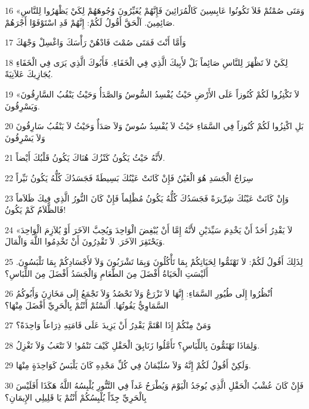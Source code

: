 \par 16 «وَمَتَى صُمْتُمْ فَلاَ تَكُونُوا عَابِسِينَ كَالْمُرَائِينَ فَإِنَّهُمْ يُغَيِّرُونَ وُجُوهَهُمْ لِكَيْ يَظْهَرُوا لِلنَّاسِ صَائِمِينَ. اَلْحَقَّ أَقُولُ لَكُمْ: إِنَّهُمْ قَدِ اسْتَوْفَوْا أَجْرَهُمْ.
\par 17 وَأَمَّا أَنْتَ فَمَتَى صُمْتَ فَادْهُنْ رَأْسَكَ وَاغْسِلْ وَجْهَكَ
\par 18 لِكَيْ لاَ تَظْهَرَ لِلنَّاسِ صَائِماً بَلْ لأَبِيكَ الَّذِي فِي الْخَفَاءِ. فَأَبُوكَ الَّذِي يَرَى فِي الْخَفَاءِ يُجَازِيكَ عَلاَنِيَةً.
\par 19 «لاَ تَكْنِزُوا لَكُمْ كُنُوزاً عَلَى الأَرْضِ حَيْثُ يُفْسِدُ السُّوسُ وَالصَّدَأُ وَحَيْثُ يَنْقُبُ السَّارِقُونَ وَيَسْرِقُونَ.
\par 20 بَلِ اكْنِزُوا لَكُمْ كُنُوزاً فِي السَّمَاءِ حَيْثُ لاَ يُفْسِدُ سُوسٌ وَلاَ صَدَأٌ وَحَيْثُ لاَ يَنْقُبُ سَارِقُونَ وَلاَ يَسْرِقُونَ
\par 21 لأَنَّهُ حَيْثُ يَكُونُ كَنْزُكَ هُنَاكَ يَكُونُ قَلْبُكَ أَيْضاً.
\par 22 سِرَاجُ الْجَسَدِ هُوَ الْعَيْنُ فَإِنْ كَانَتْ عَيْنُكَ بَسِيطَةً فَجَسَدُكَ كُلُّهُ يَكُونُ نَيِّراً
\par 23 وَإِنْ كَانَتْ عَيْنُكَ شِرِّيرَةً فَجَسَدُكَ كُلُّهُ يَكُونُ مُظْلِماً فَإِنْ كَانَ النُّورُ الَّذِي فِيكَ ظَلاَماً فَالظَّلاَمُ كَمْ يَكُونُ!
\par 24 «لاَ يَقْدِرُ أَحَدٌ أَنْ يَخْدِمَ سَيِّدَيْنِ لأَنَّهُ إِمَّا أَنْ يُبْغِضَ الْوَاحِدَ وَيُحِبَّ الآخَرَ أَوْ يُلاَزِمَ الْوَاحِدَ وَيَحْتَقِرَ الآخَرَ. لاَ تَقْدِرُونَ أَنْ تَخْدِمُوا اللَّهَ وَالْمَالَ.
\par 25 لِذَلِكَ أَقُولُ لَكُمْ: لاَ تَهْتَمُّوا لِحَيَاتِكُمْ بِمَا تَأْكُلُونَ وَبِمَا تَشْرَبُونَ وَلاَ لأَجْسَادِكُمْ بِمَا تَلْبَسُونَ. أَلَيْسَتِ الْحَيَاةُ أَفْضَلَ مِنَ الطَّعَامِ وَالْجَسَدُ أَفْضَلَ مِنَ اللِّبَاسِ؟
\par 26 اُنْظُرُوا إِلَى طُيُورِ السَّمَاءِ: إِنَّهَا لاَ تَزْرَعُ وَلاَ تَحْصُدُ وَلاَ تَجْمَعُ إِلَى مَخَازِنَ وَأَبُوكُمُ السَّمَاوِيُّ يَقُوتُهَا. أَلَسْتُمْ أَنْتُمْ بِالْحَرِيِّ أَفْضَلَ مِنْهَا؟
\par 27 وَمَنْ مِنْكُمْ إِذَا اهْتَمَّ يَقْدِرُ أَنْ يَزِيدَ عَلَى قَامَتِهِ ذِرَاعاً وَاحِدَةً؟
\par 28 وَلِمَاذَا تَهْتَمُّونَ بِاللِّبَاسِ؟ تَأَمَّلُوا زَنَابِقَ الْحَقْلِ كَيْفَ تَنْمُو! لاَ تَتْعَبُ وَلاَ تَغْزِلُ.
\par 29 وَلَكِنْ أَقُولُ لَكُمْ إِنَّهُ وَلاَ سُلَيْمَانُ فِي كُلِّ مَجْدِهِ كَانَ يَلْبَسُ كَوَاحِدَةٍ مِنْهَا.
\par 30 فَإِنْ كَانَ عُشْبُ الْحَقْلِ الَّذِي يُوجَدُ الْيَوْمَ وَيُطْرَحُ غَداً فِي التَّنُّورِ يُلْبِسُهُ اللَّهُ هَكَذَا أَفَلَيْسَ بِالْحَرِيِّ جِدّاً يُلْبِسُكُمْ أَنْتُمْ يَا قَلِيلِي الإِيمَانِ؟
